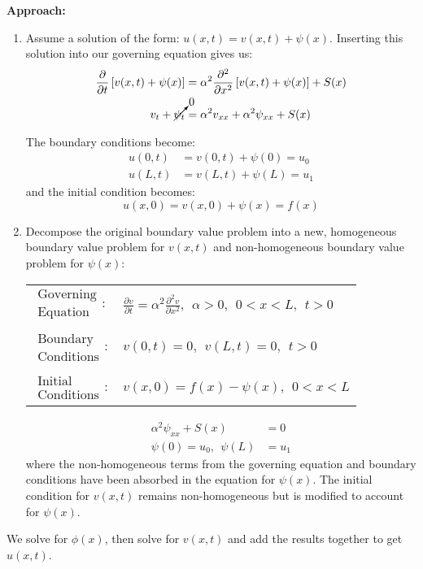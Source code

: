 \noindent\textbf{Approach:}
\begin{enumerate}
\item Assume a solution of the form: $u(x,t) = v(x,t) + \psi(x)$.  Inserting this solution into our governing equation gives us:
\begin{align*}
\frac{\partial}{\partial t}\left[v(x,t)+\psi(x)\right]  &= \alpha^2 \frac{\partial^2}{\partial x^2}\left[v(x,t)+\psi(x)\right] + S(x) \\
v_{t} + \cancelto{0}{\psi_{t}}  &= \alpha^2 v_{xx} + \alpha^2 \psi_{xx} + S(x) 
\end{align*}

The boundary conditions become:
\begin{align*}
u(0,t) &= v(0,t) + \psi(0) = u_0 \\
u(L,t) &= v(L,t) + \psi(L) = u_1
\end{align*}
and the initial condition becomes:
\begin{equation*}
u(x,0) = v(x,0) + \psi(x) = f(x)
\end{equation*}

\item Decompose the original boundary value problem into a new, homogeneous boundary value problem for $v(x,t)$ and non-homogeneous boundary value problem for $\psi(x)$:
\begin{table}[h!]
\begin{tabular}{l l}
$\substack{\text{Governing} \\\text{Equation}}: $& $\frac{\partial v}{\partial t} = \alpha^2 \frac{\partial^2 v}{\partial x^2}, \ \ \alpha>0, \ \ 0<x<L, \ \ t>0$ \\
& \\
$\substack{\text{Boundary} \\ \text{Conditions}}: $& $v(0,t)=0, \ \ v(L,t) = 0, \ \ t>0$\\
& \\
$\substack{\text{Initial} \\ \text{Conditions}}: $ & $v(x,0) = f(x)-\psi(x), \ \ 0<x<L $ \\
\end{tabular}
\end{table}

\begin{align*}
\alpha^2 \psi_{xx} + S(x) &= 0 \\
\psi(0) = u_0, \ \ \psi(L) &= u_1
\end{align*}
where the non-homogeneous terms from the governing equation and boundary conditions have been absorbed in the equation for $\psi(x)$.  The initial condition for $v(x,t)$ remains non-homogeneous but is modified to account for $\psi(x)$.
\end{enumerate}
We solve for $\phi(x)$, then solve for $v(x,t)$ and add the results together to get $u(x,t)$.

